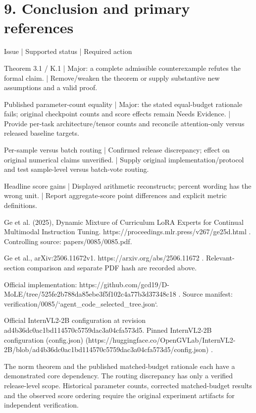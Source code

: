 \documentclass[10pt]{article}
\begin{document}
\section*{9. Conclusion and primary references}
Issue | Supported status | Required action\par
Theorem 3.1 / K.1 | Major: a complete admissible counterexample refutes the formal claim. | Remove/weaken the theorem or supply substantive new assumptions and a valid proof.\par
Published parameter-count equality | Major: the stated equal-budget rationale fails; original checkpoint counts and score effects remain Needs Evidence. | Provide per-task architecture/tensor counts and reconcile attention-only versus released baseline targets.\par
Per-sample versus batch routing | Confirmed release discrepancy; effect on original numerical claims unverified. | Supply original implementation/protocol and test sample-level versus batch-vote routing.\par
Headline score gains | Displayed arithmetic reconstructs; percent wording has the wrong unit. | Report aggregate-score point differences and explicit metric definitions.\par
[P1] Ge et al. (2025), Dynamic Mixture of Curriculum LoRA Experts for Continual Multimodal Instruction Tuning. https://proceedings.mlr.press/v267/ge25d.html . Controlling source: papers/0085/0085.pdf.\par
[P2] Ge et al., arXiv:2506.11672v1. https://arxiv.org/abs/2506.11672 . Relevant-section comparison and separate PDF hash are recorded above.\par
[P3] Official implementation: https://github.com/gcd19/D-MoLE/tree/525fe2b788da85ebe3f5f102c4a77b3d37348c18 . Source manifest: verification/0085/`agent\_code\_selected\_tree.json`.\par
[P4] Official InternVL2-2B configuration at revision ad4b36dc0ac1bd114570c5759dac3a04cfa573d5. Pinned InternVL2-2B configuration (config.json) (https://huggingface.co/OpenGVLab/InternVL2-2B/blob/ad4b36dc0ac1bd114570c5759dac3a04cfa573d5/config.json) .\par
The norm theorem and the published matched-budget rationale each have a demonstrated core dependency. The routing discrepancy has only a verified release-level scope. Historical parameter counts, corrected matched-budget results and the observed score ordering require the original experiment artifacts for independent verification.\par
\end{document}
